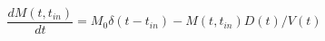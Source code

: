 \begin{equation}
\frac{d M(t,t_{in})}{dt} = M_0 \delta(t-t_{in}) - M(t,t_{in})D(t)/V(t)
\end{equation}